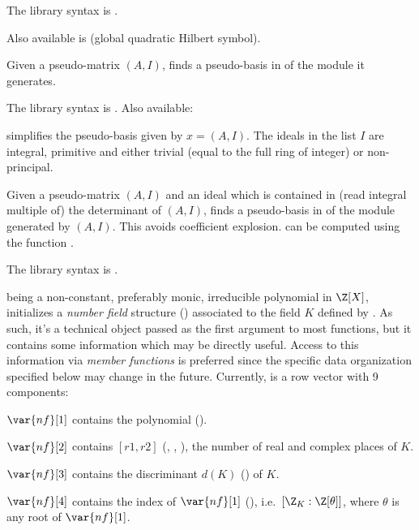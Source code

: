 The library syntax is .

Also available is  (global
quadratic Hilbert symbol).

\label{se:nfhnf}
Given a pseudo-matrix $(A,I)$, finds a
pseudo-basis in  of the module it generates.

The library syntax is .
Also available:

 simplifies the pseudo-basis
given by $x = (A,I)$. The ideals in the list $I$ are integral, primitive and
either trivial (equal to the full ring of integer) or non-principal.

\label{se:nfhnfmod}
Given a pseudo-matrix $(A,I)$
and an ideal  which is contained in (read integral multiple of) the
determinant of $(A,I)$, finds a pseudo-basis in 
of the module generated by $(A,I)$. This avoids coefficient explosion.
 can be computed using the function .

The library syntax is .

\label{se:nfinit}
 being a non-constant,
preferably monic, irreducible polynomial in $\Z[X]$, initializes a
\emph{number field} structure () associated to the field $K$ defined
by . As such, it's a technical object passed as the first argument
to most  functions, but it contains some information which
may be directly useful. Access to this information via \emph{member
functions} is preferred since the specific data organization specified below
may change in the future. Currently,  is a row vector with 9
components:

$\var{nf}[1]$ contains the polynomial  ().

$\var{nf}[2]$ contains $[r1,r2]$ (, ,
), the number of real and complex places of $K$.

$\var{nf}[3]$ contains the discriminant $d(K)$ () of $K$.

$\var{nf}[4]$ contains the index of $\var{nf}[1]$ (),
i.e.~$[\Z_K : \Z[\theta]]$, where $\theta$ is any root of $\var{nf}[1]$.

